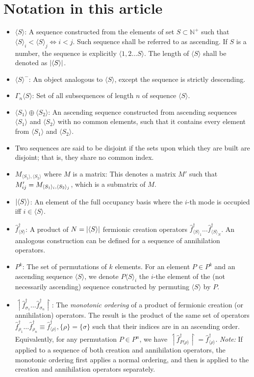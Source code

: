\documentclass[12pt]{article}
\newcommand{\seq}[1]{\langle #1\rangle}
\newcommand{\asc}[1]{\upharpoonleft #1 \upharpoonright}
\newcommand{\hc}{^\dagger}
\begin{document}
	\section{Notation in this article}
	\begin{itemize}
		\item $\seq{S}$: A sequence constructed from the elements of set $S\subset \mathbb{N}^+$ such that\\ $\seq{S}_i< \seq{S}_j\iff i<j$. Such sequence shall be referred to as ascending. If $S$ is a number, the sequence is explicitly $\seq{1, 2\dots S}$. The length of $\seq{S}$ shall be denoted as $\abs{\seq{S}}$.
		\item $\seq{S}^-$: An object analogous to $\seq{S}$, except the sequence is strictly descending.
		\item $\Gamma_n\seq{S}$: Set of all subsequences of length $n$ of sequence $\seq{S}$.
		\item $\seq{S_1}\oplus\seq{S_2}$: An ascending sequence constructed from ascending sequences $\seq{S_1}$ and $\seq{S_2}$ with no common elements, such that it contains every element from $\seq{S_1}$ and $\seq{S_2}$.
		\item Two sequences are said to be disjoint if the sets upon which they are built are disjoint; that is, they share no common index.
		\item $M_{\seq{S_1},\seq{S_2}}$ where $M$ is a matrix: This denotes a matrix $M'$ such that $M'_{ij}=\nolinebreak M_{\seq{S_1}_i,\seq{S_2}_j}$, which is a submatrix of $M$.
		\item $\ket{\seq{S}}$: An element of the full occupancy basis where the $i$-th mode is occupied iff $i\in\seq{S}$.
		\item $\hat{f}\hc_{\seq{S}}$: A product of $N=\abs{\seq{S}}$ fermionic creation operators $\hat{f}\hc_{\seq{S}_1}\dots \hat{f}\hc_{\seq{S}_N}$. An analogous construction can be defined for a sequence of annihilation operators.
		\item $P^k$: The set of permutations of $k$ elements. For an element $P\in P^k$ and an ascending sequence $\seq{S}$, we denote $P\seq{S}_i$ the $i$-the element of the (not necessarily ascending) sequence constructed by permuting $\seq{S}$ by $P$.
		\item $\asc{\hat{f}\hc_{\sigma_1}\dots\hat{f}\hc_{\sigma_n}}$: The \textit{monotonic ordering} of a product of fermionic creation (or annihilation) operators. The result is the product of the same set of operators $\hat{f}\hc_{\rho_1}\dots\hat{f}\hc_{\rho_n}\equiv \hat{f}\hc_{\seq{\rho}}, \{\rho\}=\{\sigma\}$ such that their indices are in an ascending order. Equivalently, for any permutation $P\in P^n$, we have $\asc{\hat{f}\hc_{P\seq{\rho}}}=\hat{f}\hc_{\seq{\rho}}$. \textit{Note:} If applied to a sequence of both creation and annihilation operators, the monotonic ordering first applies a normal ordering, and then is applied to the creation and annihilation operators separately.

\end{itemize}
\end{document}
